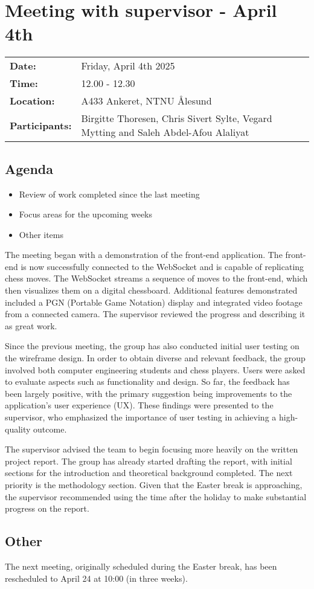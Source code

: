 \section{Meeting with supervisor - April 4th}
\begin{tabular}{ll}
    \textbf{Date:} & Friday, April 4th 2025 \\
    \textbf{Time:} & 12.00 - 12.30\\
    \textbf{Location:} & A433 Ankeret, NTNU Ålesund \\
    \textbf{Participants:} & Birgitte Thoresen, Chris Sivert Sylte, Vegard Mytting and Saleh Abdel-Afou Alaliyat\\
\end{tabular}

\vspace{0.5cm}

\subsection{Agenda}

\begin{itemize} 
    \item Review of work completed since the last meeting
    \item Focus areas for the upcoming weeks
    \item Other items
\end{itemize}

The meeting began with a demonstration of the front-end application. The front-end is now successfully connected to the WebSocket and is capable of replicating chess moves. The WebSocket streams a sequence of moves to the front-end, which then visualizes them on a digital chessboard. Additional features demonstrated included a PGN (Portable Game Notation) display and integrated video footage from a connected camera. The supervisor reviewed the progress and describing it as great work.

Since the previous meeting, the group has also conducted initial user testing on the wireframe design. In order to obtain diverse and relevant feedback, the group involved both computer engineering students and chess players. Users were asked to evaluate aspects such as functionality and design. So far, the feedback has been largely positive, with the primary suggestion being improvements to the application's user experience (UX). These findings were presented to the supervisor, who emphasized the importance of user testing in achieving a high-quality outcome.

The supervisor advised the team to begin focusing more heavily on the written project report. The group has already started drafting the report, with initial sections for the introduction and theoretical background completed. The next priority is the methodology section. Given that the Easter break is approaching, the supervisor recommended using the time after the holiday to make substantial progress on the report.

\subsection{Other}
The next meeting, originally scheduled during the Easter break, has been rescheduled to April 24 at 10:00 (in three weeks).
